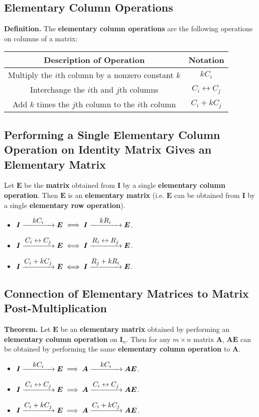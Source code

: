 \documentclass[../ma2001_notes.tex]{subfiles}
\begin{document}
\subsection{Elementary Column Operations}
\textbf{Definition.} The \textbf{elementary column operations} are the following operations on columns of a matrix:
\begin{center}
\begin{tabular}{|c|c|}
\hline
\textbf{Description of Operation} & \textbf{Notation} \\
\hline
Multiply the \(i\)th column by a nonzero constant \(k\) & \(kC_i\) \\
\hline
Interchange the \(i\)th and \(j\)th columns & \(C_i\leftrightarrow C_j\) \\
\hline
Add \(k\) times the \(j\)th column to the \(i\)th column & \(C_i+kC_j\) \\
\hline
\end{tabular}
\end{center}

\subsection{Performing a Single Elementary Column Operation on Identity Matrix Gives an Elementary Matrix}
Let \(\bm{E}\) be the \textbf{matrix} obtained from \(\bm{I}\) by a single \textbf{elementary column operation}. Then \(\bm{E}\) is an \textbf{elementary matrix} (i.e. \(\bm{E}\) can be obtained from \(\bm{I}\) by a single \textbf{elementary row operation}).
\begin{itemize}
	\item\(\bm{I}\ro{$$kC_i$$}\bm{E}\iff\bm{I}\ro{$$kR_i$$}\bm{E}\).
	\item\(\bm{I}\ro{$$C_i\leftrightarrow C_j$$}\bm{E}\iff\bm{I}\ro{$$R_i\leftrightarrow R_j$$}\bm{E}\).
	\item\(\bm{I}\ro{$$C_i+kC_j$$}\bm{E}\iff\bm{I}\ro{$$R_j+kR_i$$}\bm{E}\).
\end{itemize}

\subsection{Connection of Elementary Matrices to Matrix Post-Multiplication}
\textbf{Theorem.} Let \(\bm{E}\) be an \textbf{elementary matrix} obtained by performing an \textbf{elementary column operation} on \(\bm{I}_n\). Then for any \(m\times n\) matrix \(\bm{A}\), \(\bm{AE}\) can be obtained by performing the same \textbf{elementary column operation} to \(\bm{A}\).
\begin{itemize}
	\item\(\bm{I}\ro{$$kC_i$$}\bm{E}\implies\bm{A}\ro{$$kC_i$$}\bm{AE}\).
	\item\(\bm{I}\ro{$$C_i\leftrightarrow C_j$$}\bm{E}\implies\bm{A}\ro{$$C_i\leftrightarrow C_j$$}\bm{AE}\).
	\item\(\bm{I}\ro{$$C_i+kC_j$$}\bm{E}\implies\bm{A}\ro{$$C_i+kC_j$$}\bm{AE}\).
\end{itemize}
\end{document}
